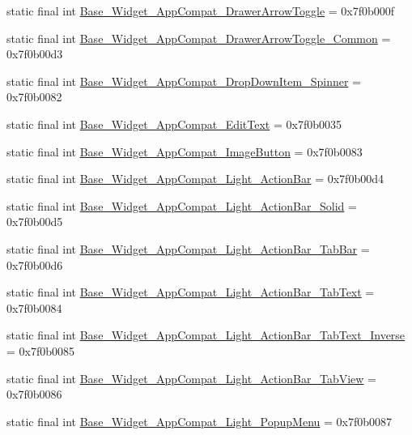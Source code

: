 \begin{CompactItemize}
static final int \hyperlink{classandroid_1_1support_1_1v7_1_1palette_1_1_r_1_1style_d8e6f7312fb75c53a08b0466e8f0c0db}{Base\_\-Widget\_\-AppCompat\_\-DrawerArrowToggle} = 0x7f0b000f
\item 
static final int \hyperlink{classandroid_1_1support_1_1v7_1_1palette_1_1_r_1_1style_890a82034990b6f93d0c37980913fbd9}{Base\_\-Widget\_\-AppCompat\_\-DrawerArrowToggle\_\-Common} = 0x7f0b00d3
\item 
static final int \hyperlink{classandroid_1_1support_1_1v7_1_1palette_1_1_r_1_1style_db1fe01f103f1fa034d878d6ebb96923}{Base\_\-Widget\_\-AppCompat\_\-DropDownItem\_\-Spinner} = 0x7f0b0082
\item 
static final int \hyperlink{classandroid_1_1support_1_1v7_1_1palette_1_1_r_1_1style_38da0a592d625532cd883a6e84cf6082}{Base\_\-Widget\_\-AppCompat\_\-EditText} = 0x7f0b0035
\item 
static final int \hyperlink{classandroid_1_1support_1_1v7_1_1palette_1_1_r_1_1style_f2ad529fd1b6a1a830501613d3c5d334}{Base\_\-Widget\_\-AppCompat\_\-ImageButton} = 0x7f0b0083
\item 
static final int \hyperlink{classandroid_1_1support_1_1v7_1_1palette_1_1_r_1_1style_7976d04dd800ffd16df27fad9b7d9cbb}{Base\_\-Widget\_\-AppCompat\_\-Light\_\-ActionBar} = 0x7f0b00d4
\item 
static final int \hyperlink{classandroid_1_1support_1_1v7_1_1palette_1_1_r_1_1style_0c39592be235755600c76a82218dd14e}{Base\_\-Widget\_\-AppCompat\_\-Light\_\-ActionBar\_\-Solid} = 0x7f0b00d5
\item 
static final int \hyperlink{classandroid_1_1support_1_1v7_1_1palette_1_1_r_1_1style_dd1b27f088bf9a8bdf7709e2c8183620}{Base\_\-Widget\_\-AppCompat\_\-Light\_\-ActionBar\_\-TabBar} = 0x7f0b00d6
\item 
static final int \hyperlink{classandroid_1_1support_1_1v7_1_1palette_1_1_r_1_1style_626a332edacab9ec26008a17821680ef}{Base\_\-Widget\_\-AppCompat\_\-Light\_\-ActionBar\_\-TabText} = 0x7f0b0084
\item 
static final int \hyperlink{classandroid_1_1support_1_1v7_1_1palette_1_1_r_1_1style_9e7c9c816db27541b1cf9223876f4008}{Base\_\-Widget\_\-AppCompat\_\-Light\_\-ActionBar\_\-TabText\_\-Inverse} = 0x7f0b0085
\item 
static final int \hyperlink{classandroid_1_1support_1_1v7_1_1palette_1_1_r_1_1style_2a4ba6346bc0082f8d7a486bd3de7ade}{Base\_\-Widget\_\-AppCompat\_\-Light\_\-ActionBar\_\-TabView} = 0x7f0b0086
\item 
static final int \hyperlink{classandroid_1_1support_1_1v7_1_1palette_1_1_r_1_1style_5eda83192cd60c21b76387fe0a8e2e08}{Base\_\-Widget\_\-AppCompat\_\-Light\_\-PopupMenu} = 0x7f0b0087

\end{CompactItemize}

